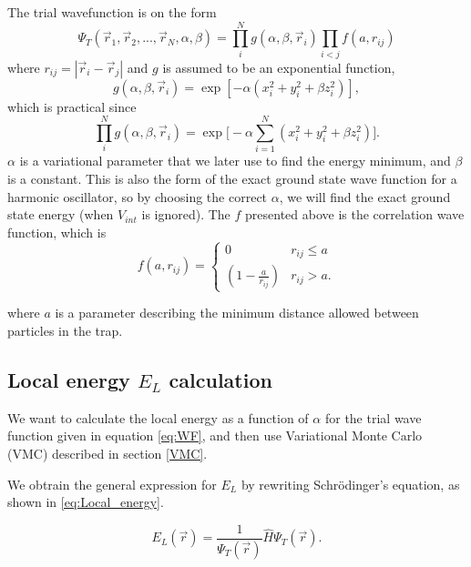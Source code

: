 \documentclass[norsk,a4paper,12pt]{article}
\begin{document}
The trial wavefunction is on the form 
\begin{equation}
\Psi_T(\vec{r}_1, \vec{r}_2, ..., \vec{r}_N, \alpha, \beta)=\prod_i^Ng(\alpha, \beta, \vec{r}_i)\prod_{i<j}f(a,r_{ij})
\label{eq:WF}
\end{equation}
where $r_{ij}=|\vec{r}_i-\vec{r}_j|$ and $g$ is assumed to be an exponential function,
\begin{equation}
g(\alpha, \beta, \vec{r}_i)=\exp[-\alpha(x_i^2+y_i^2+\beta z_i^2)],
\end{equation}
which is practical since
\begin{equation}
\prod_i^Ng(\alpha, \beta, \vec{r}_i)=\exp\Big[-\alpha\sum_{i=1}^N(x_i^2+y_i^2+\beta z_i^2)\Big].
\end{equation}
$\alpha$ is a variational parameter that we later use to find the energy minimum, and $\beta$ is a constant. This is also the form of the exact ground state wave function for a harmonic oscillator, so by choosing the correct $\alpha$, we will find the exact ground state energy (when $V_{int}$ is ignored). The $f$ presented above is the correlation wave function, which is 
\begin{equation}
\label{eq:WF_interaction_part}
f(a,r_{ij})=
\begin{cases} 
   0 & r_{ij} \leq a \\
   \left(1-\frac{a}{r_{ij}}\right) & r_{ij} > a.
\end{cases}
\end{equation}

where $a$ is a parameter describing the minimum distance allowed between particles in the trap.

\subsection{Local energy $E_L$ calculation}

We want to calculate the local energy as a function of $\alpha$ for the trial wave function given in equation \ref{eq:WF}, and then use Variational Monte Carlo (VMC) described in section \ref{VMC}. 

 We obtrain the general  expression for $E_L$ by rewriting Schr\"{o}dinger's equation, as shown in \ref{eq:Local_energy}.

\begin{equation}
E_L(\vec{r})=\frac{1}{\Psi_T(\vec{r})}\hat{H}\Psi_T(\vec{r}).
\label{eq:Local_energy}
\end{equation}
\end{document}
